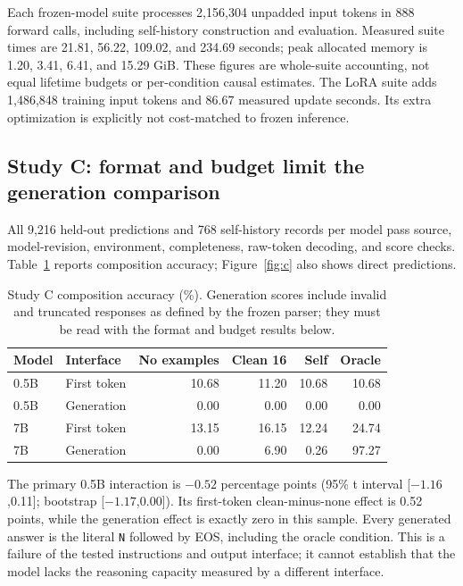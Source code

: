 \documentclass[11pt]{article}
\begin{document}
Each frozen-model suite processes 2,156,304 unpadded input tokens in 888
forward calls, including self-history construction and evaluation. Measured
suite times are 21.81, 56.22, 109.02, and 234.69 seconds; peak allocated memory
is 1.20, 3.41, 6.41, and 15.29 GiB. These figures are whole-suite accounting,
not equal lifetime budgets or per-condition causal estimates. The LoRA suite
adds 1,486,848 training input tokens and 86.67 measured update seconds. Its
extra optimization is explicitly not cost-matched to frozen inference.

\subsection{Study C: format and budget limit the generation comparison}
All 9,216 held-out predictions and 768 self-history records per model pass
source, model-revision, environment, completeness, raw-token decoding, and
score checks. Table~\ref{tab:c} reports composition accuracy; Figure~\ref{fig:c}
also shows direct predictions.

\begin{table}[htbp]
\centering\small
\begin{tabular}{llrrrr}
\toprule
Model & Interface & No examples & Clean 16 & Self & Oracle \\
\midrule
0.5B & First token & 10.68 & 11.20 & 10.68 & 10.68 \\
0.5B & Generation & 0.00 & 0.00 & 0.00 & 0.00 \\
7B & First token & 13.15 & 16.15 & 12.24 & 24.74 \\
7B & Generation & 0.00 & 6.90 & 0.26 & 97.27 \\
\bottomrule
\end{tabular}
\caption{Study C composition accuracy (\%). Generation scores include invalid
and truncated responses as defined by the frozen parser; they must be read
with the format and budget results below.}
\label{tab:c}
\end{table}

The primary 0.5B interaction is $-0.52$ percentage points (95\% t interval
[$-1.16$,0.11]; bootstrap [$-1.17$,0.00]). Its first-token clean-minus-none
effect is 0.52 points, while the generation effect is exactly zero in this
sample. Every generated answer is the literal \texttt{N} followed by EOS,
including the oracle condition. This is a failure of the tested instructions
and output interface; it cannot establish that the model lacks the reasoning
capacity measured by a different interface.
\end{document}
